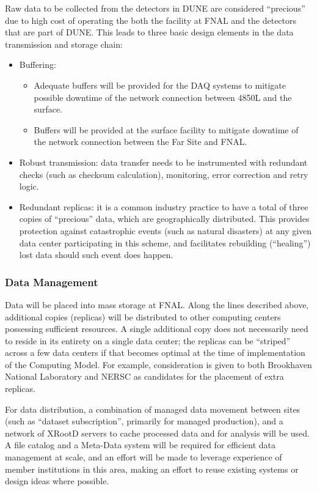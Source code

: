 Raw data to be collected from the detectors in DUNE are considered ``precious'' due to high cost of operating the both the facility at FNAL
and the detectors that are part of DUNE. This leads to three basic design elements in the data transmission and storage chain:
\begin{itemize}
\item Buffering:
\begin{itemize}
\item Adequate buffers will be provided for the DAQ systems  to mitigate possible downtime of the network connection between 4850L and the surface.
\item Buffers will be provided at the surface facility to mitigate downtime of the network connection between the Far Site and FNAL.
\end{itemize}
\item Robust transmission: data transfer needs to be instrumented with redundant checks (such as checksum calculation), monitoring, error correction and retry logic.
\item Redundant replicas: it is a common industry practice to have a total of three copies of ``precious'' data, which are geographically distributed. This provides protection against catastrophic events (such as natural disasters) at any given data center participating in this scheme, and facilitates rebuilding (``healing'')  lost data should such event does happen.
\end{itemize}



\subsubsection{Data Management}
\label{sec:detectors-sc-infrastructure-computing-model-data-mgt}

Data will be placed into mass storage at FNAL. Along the lines described above, additional copies (replicas) will be distributed to other
computing centers possessing sufficient resources.
A single additional copy does not necessarily need to reside in its entirety on a single data center; the replicas can be ``striped'' across a few data centers if that
becomes optimal at the time of implementation of the Computing Model. For example, consideration is given to both Brookhaven National Laboratory
and NERSC as candidates for the placement of extra replicas.

For data distribution, a combination of managed data movement between sites (such as ``dataset subscription'',
primarily for managed production), and a network of XRootD servers to cache processed data and for analysis will be used.
A file catalog and a Meta-Data system will be required for efficient data management at scale, and an effort will be made to leverage experience of
member institutions in this area, making an effort to reuse existing systems or design ideas where possible.

